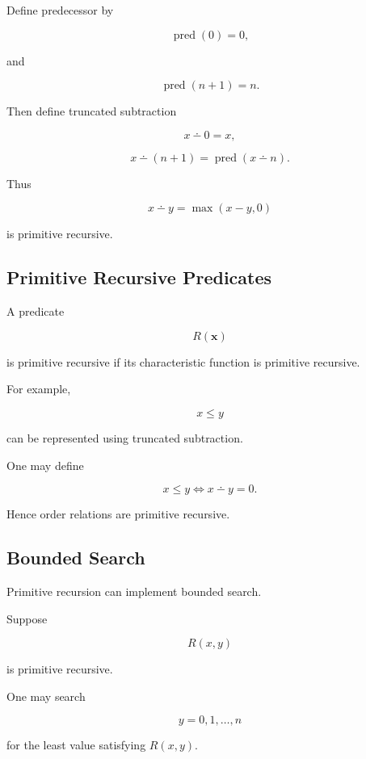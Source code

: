 Define predecessor by

\[
\boxed{
\operatorname{pred}(0)=0,
}
\]

and

\[
\boxed{
\operatorname{pred}(n+1)=n.
}
\]

Then define truncated subtraction

\[
\boxed{
x\dotminus0=x,
}
\]

\[
\boxed{
x\dotminus(n+1)
=
\operatorname{pred}(x\dotminus n).
}
\]

Thus

\[
\boxed{
x\dotminus y
=
\max(x-y,0)
}
\]

is primitive recursive.

\subsection{Primitive Recursive Predicates}
\label{subsec:primitive-recursive-predicates}

A predicate

\[
R(\mathbf{x})
\]

is primitive recursive if its characteristic function is primitive
recursive.

For example,

\[
\boxed{
x\leq y
}
\]

can be represented using truncated subtraction.

One may define

\[
x\leq y
\iff
x\dotminus y=0.
\]

Hence order relations are primitive recursive.

\subsection{Bounded Search}
\label{subsec:bounded-search-recursion}

Primitive recursion can implement bounded search.

Suppose

\[
R(x,y)
\]

is primitive recursive.

One may search

\[
y=0,1,\ldots,n
\]

for the least value satisfying \(R(x,y)\).

